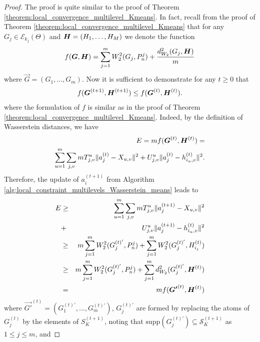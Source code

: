 \begin{proof}
The proof is quite similar to the proof of Theorem \ref{theorem:local_convergence_multilevel_Kmeans}. In fact, recall from the proof of Theorem \ref{theorem:local_convergence_multilevel_Kmeans} that for any $G_{j} \in \mathcal{E}_{k_{j}}(\Theta)$ and $\boldsymbol{H} =(H_{1},\ldots,H_{M})$ we denote the function 
\begin{eqnarray}
f(\boldsymbol{G}, \boldsymbol{H})=\mathop {\sum }\limits_{j=1}^{m}{W_{2}^{2}(G_{j},P_{n}^{j})}+\dfrac{d_{W_{2}}^{2}(G_{j},\boldsymbol{H})}{m} \nonumber
\end{eqnarray}
where $\vec{G}=(G_{1},\ldots,G_{m})$. Now it is sufficient to demonstrate for any $t \geq 0$ that
\begin{eqnarray}
f(\boldsymbol{G}^{(t+1)},\boldsymbol{H}^{(t+1)}) \leq f(\boldsymbol{G}^{(t)},\boldsymbol{H}^{(t)}). \nonumber
\end{eqnarray}
where the formulation of $f$ is similar as in the proof of Theorem \ref{theorem:local_convergence_multilevel_Kmeans}. %
Indeed, by the definition of Wasserstein distances, we have
\begin{eqnarray}
E = m f(\boldsymbol{G}^{(t)},\boldsymbol{H}^{(t)})  = \nonumber \\
 \sum \limits_{u=1}^{m}{\sum \limits_{j,v}{mT_{j,v}^{u}\|a_{j}^{(t)}-X_{u,v}\|^{2}} +  U_{j,v}^{u}\|a_{j}^{(t)}-h_{i_{u},v}^{(t)}\|^{2}}. \nonumber
\end{eqnarray}
Therefore, the update of $a_{i}^{(t+1)}$ from Algorithm \ref{alg:local_constraint_multilevels_Wasserstein_means} %
leads to
\begin{eqnarray}
E & \geq &  \sum \limits_{u=1}^{m}{\sum \limits_{j,v}{mT_{j,v}^{u}\|a_{j}^{(t+1)}-X_{u,v}\|^{2}}} \nonumber \\
& + & U_{j,v}^{u}\|a_{j}^{(t+1)}-h_{i_{u},v}^{(t)}\|^{2} \nonumber \\
& \geq & m \sum \limits_{j=1}^{m}{W_{2}^{2}(G_{j}^{(t)'},P_{n}^{j})}+\sum \limits_{j=1}^{m}{W_{2}^{2}(G_{j}^{(t)'},H_{i_{j}}^{(t)})} \nonumber \\
& \geq & m \sum \limits_{j=1}^{m}{W_{2}^{2}(G_{j}^{(t)'},P_{n}^{j})}+\sum \limits_{j=1}^{m}{d_{W_{2}}^{2}(G_{j}^{(t)'},\boldsymbol{H}^{(t)})} \nonumber \\
& = & mf(\boldsymbol{G'}^{(t)},\boldsymbol{H}^{(t)}) \nonumber
\end{eqnarray}
where $\vec{G'}^{(t)}=(G_{1}^{(t)'},\ldots,G_{m}^{(t)'})$, $G_{j}^{(t)'}$ are formed by replacing the atoms of $G_{j}^{(t)}$ by the 
elements of $S_{K}^{(t+1)}$, noting that $\text{supp}(G_{j}^{(t)'}) \subseteq  \mathcal{S}_{K}^{(t+1)}$ as $1 \leq j \leq m$, and 

\end{proof}
